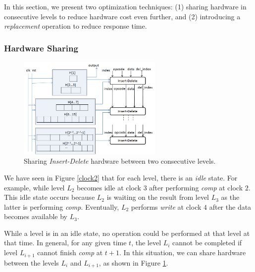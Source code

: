 In this section, we present two optimization techniques: (1) sharing hardware in consecutive levels to reduce hardware cost even further, and (2) introducing a {\it replacement} operation to reduce response time.

\subsubsection{Hardware Sharing}
\begin{figure}[!ht]
  \centering
  \includegraphics[width=7cm]{fig/d3.png}
      \caption{Sharing {\it Insert-Delete} hardware between two consecutive levels.}
    \label{d3}
\end{figure}

We have seen in Figure \ref{clock2} that for each level, there is an {\it idle} state.
For example, while level $L_2$ becomes idle at clock $3$ after performing {\it comp} at clock $2$.
This idle state occurs because $L_2$ is waiting on the result from level $L_3$ as the latter is performing {\it comp}.
Eventually, $L_2$ performs {\it write} at clock $4$ after the data becomes available by $L_3$.

While a level is in an idle state, no operation could be performed at that level at that time.
In general, for any given time $t$, the level $L_i$ cannot be completed if level $L_{i+1}$ cannot finish {\it comp} at $t+1$.
In this situation, we can share hardware between the levels $L_i$ and $L_{i+1}$, as shown in Figure \ref{d3}.

